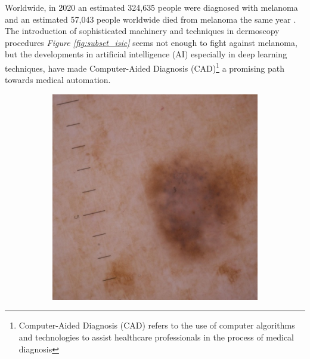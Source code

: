 Worldwide, in 2020 an estimated 324,635 people were diagnosed with melanoma and an estimated 57,043 people worldwide died from melanoma the same year \cite{CancerStats}. The introduction of sophisticated machinery and techniques in dermoscopy procedures \textit{Figure \ref{fig:subset_isic}} seems not enough to fight against melanoma, but the developments in artificial intelligence (AI) especially in deep learning techniques, have made Computer-Aided Diagnosis (CAD)\footnote{Computer-Aided Diagnosis (CAD) refers to the use of computer algorithms and technologies to assist healthcare professionals in the process of medical diagnosis} a promising path towards medical automation.

\begin{figure}[h!]
\centering
\begin{subfigure}{0.3\textwidth}
    \includegraphics[width=\textwidth]{imatges/introduction/subset_isic/ISIC_1752943.jpg}
\end{subfigure}
\hfill
\begin{subfigure}{0.3\textwidth}

\end{subfigure}
\end{figure}
